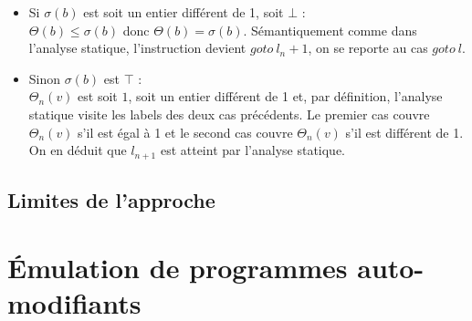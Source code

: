 \begin{itemize}
\begin{itemize}
   \item Si $\sigma(b)$ est soit un entier différent de 1, soit $\bot$ :\\
   $\Theta(b)\leq\sigma(b)$ donc $\Theta(b)=\sigma(b)$. Sémantiquement comme dans l'analyse statique, l'instruction devient $goto\ l_n+1$, on se reporte au cas $goto\ l$.
  
   \item Sinon $\sigma(b)$ est $\top$ :\\
   $\Theta_n(v)$ est soit $1$, soit un entier différent de 1 et, par définition, l'analyse statique visite les labels des deux cas précédents. Le premier cas couvre $\Theta_n(v)$ s'il est égal à 1 et le second cas couvre $\Theta_n(v)$ s'il est différent de 1. On en déduit que $l_{n+1}$ est atteint par l'analyse statique.
  \end{itemize}
\end{itemize}


\subsection{Limites de l'approche}


\section{Émulation de programmes auto-modifiants}